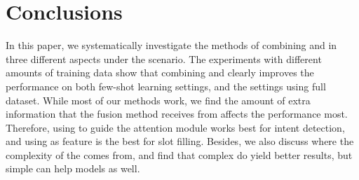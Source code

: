 \section{Conclusions}
In this paper, we systematically investigate the methods of combining \NN and \RE in three different aspects under the \SLU scenario. 
The experiments with different amounts of training data show that combining \NN and \RE clearly improves the \NN performance on both few-shot learning settings, and the settings using full dataset. 
While most of our methods work, we find the amount of extra information that the fusion method receives from \REs affects the performance most.
Therefore, using \RE to guide the attention module works best for intent detection, and using \REtags as feature is the best for slot filling.
Besides, we also discuss where the complexity of the \REs comes from, and find that complex \REs do yield better results, but simple \REs can help \NN models as well.